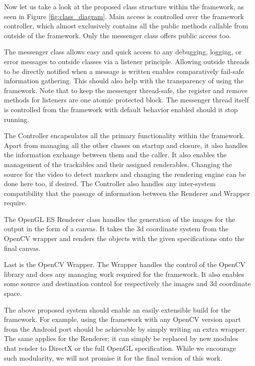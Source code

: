 Now let us take a look at the proposed class structure within the framework, as seen in Figure \ref{fig:class_diagram}.
Main access is controlled over the framework controller, which almost exclusively contains all the public methods callable from outside of the framework.
Only the messenger class offers public access too.

The messenger class allows easy and quick access to any debugging, logging, or error messages to outside classes via a listener principle.
Allowing outside threads to be directly notified when a message is written enables comparatively fail-safe information gathering.
This should also help with the transparency of using the framework.
Note that to keep the messenger thread-safe, the register and remove methods for listeners are one atomic protected block.
The messenger thread itself is controlled from the framework with default behavior enabled should it stop running.

The Controller encapsulates all the primary functionality within the framework.
Apart from managing all the other classes on startup and closure, it also handles the information exchange between them and the caller.
It also enables the management of the trackables and their assigned renderables.
Changing the source for the video to detect markers and changing the rendering engine can be done here too, if desired.
The Controller also handles any inter-system compatibility that the passage of information between the Renderer and Wrapper require.

The OpenGL ES Renderer class handles the generation of the images for the output in the form of a canvas.
It takes the 3d coordinate system from the OpenCV wrapper and renders the objects with the given specifications onto the final canvas.

Last is the OpenCV Wrapper. The Wrapper handles the control of the OpenCV library and does any managing work required for the framework.
It also enables some source and destination control for respectively the images and 3d coordinate space.

The above proposed system should enable an easily extensible build for the framework.
For example, using the framework with any OpenCV version apart from the Android port should be achievable by simply writing an extra wrapper.
The same applies for the Renderer; it can simply be replaced by new modules that render to DirectX or the full OpenGL specification.
While we encourage such modularity, we will not promise it for the final version of this work.


